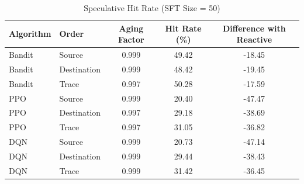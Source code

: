 \begin{table}[ht]
\centering
\caption{Speculative Hit Rate (SFT Size = 50)}
\label{tab:speculative-hitrate-50}
\begin{tabular}{llccc}
\toprule
Algorithm & Order & Aging Factor & Hit Rate (\%) & Difference with Reactive \\
\midrule
Bandit & Source & 0.999 & 49.42 & -18.45 \\
Bandit & Destination & 0.999 & 48.42 & -19.45 \\
Bandit & Trace & 0.997 & 50.28 & -17.59 \\
PPO & Source & 0.999 & 20.40 & -47.47 \\
PPO & Destination & 0.997 & 29.18 & -38.69 \\
PPO & Trace & 0.997 & 31.05 & -36.82 \\
DQN & Source & 0.999 & 20.73 & -47.14 \\
DQN & Destination & 0.999 & 29.44 & -38.43 \\
DQN & Trace & 0.999 & 31.42 & -36.45 \\
\bottomrule
\end{tabular}
\end{table}
